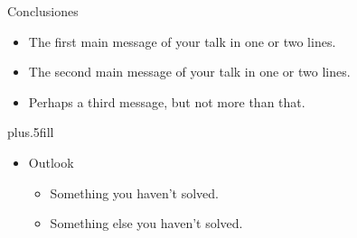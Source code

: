 \documentclass{beamer}
\begin{document}
\begin{frame}{Conclusiones}

  \begin{itemize}
  \item
    The \alert{first main message} of your talk in one or two lines.
  \item
    The \alert{second main message} of your talk in one or two lines.
  \item
    Perhaps a \alert{third message}, but not more than that.
  \end{itemize}
  
  \vskip0pt plus.5fill
  \begin{itemize}
  \item
    Outlook
    \begin{itemize}
    \item
      Something you haven't solved.
    \item
      Something else you haven't solved.
    \end{itemize}
  \end{itemize}
\end{frame}
\end{document}
